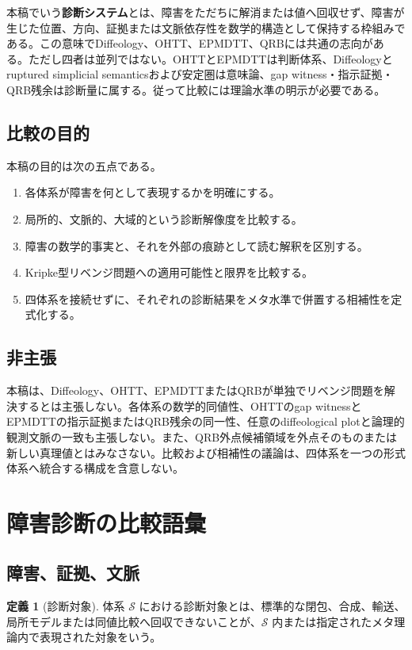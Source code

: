 \documentclass[a4paper,11pt]{ltjsarticle}
\theoremstyle{definition}
\newtheorem{definition}{定義}[section]
\theoremstyle{plain}
\begin{document}
本稿でいう\textbf{診断システム}とは、障害をただちに解消または値へ回収せず、障害が生じた位置、方向、証拠または文脈依存性を数学的構造として保持する枠組みである。この意味でDiffeology、OHTT、EPMDTT、QRBには共通の志向がある。ただし四者は並列ではない。OHTTとEPMDTTは判断体系、Diffeologyとruptured simplicial semanticsおよび安定圏は意味論、gap witness・指示証拠・QRB残余は診断量に属する。従って比較には理論水準の明示が必要である。

\subsection{比較の目的}

本稿の目的は次の五点である。
\begin{enumerate}
 \item 各体系が障害を何として表現するかを明確にする。
 \item 局所的、文脈的、大域的という診断解像度を比較する。
 \item 障害の数学的事実と、それを外部の痕跡として読む解釈を区別する。
 \item Kripke型リベンジ問題への適用可能性と限界を比較する。
 \item 四体系を接続せずに、それぞれの診断結果をメタ水準で併置する相補性を定式化する。
\end{enumerate}

\subsection{非主張}

本稿は、Diffeology、OHTT、EPMDTTまたはQRBが単独でリベンジ問題を解決するとは主張しない。各体系の数学的同値性、OHTTのgap witnessとEPMDTTの指示証拠またはQRB残余の同一性、任意のdiffeological plotと論理的観測文脈の一致も主張しない。また、QRB外点候補領域を外点そのものまたは新しい真理値とはみなさない。比較および相補性の議論は、四体系を一つの形式体系へ統合する構成を含意しない。

\section{障害診断の比較語彙}

\subsection{障害、証拠、文脈}

\begin{definition}[診断対象]
体系 $\mathcal S$ における診断対象とは、標準的な閉包、合成、輸送、局所モデルまたは同値比較へ回収できないことが、$\mathcal S$ 内または指定されたメタ理論内で表現された対象をいう。
\end{definition}
\end{document}
